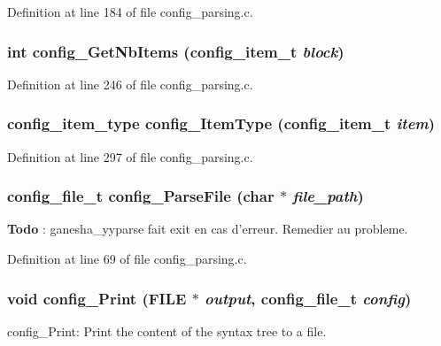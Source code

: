 Definition at line 184 of file config\_\-parsing.c.
\subsubsection[{config\_\-GetNbItems}]{\setlength{\rightskip}{0pt plus 5cm}int config\_\-GetNbItems (config\_\-item\_\-t {\em block})}\label{config__parsing_8c_a098e7a2614baf20bb96f612c3d7b8d69}


Definition at line 246 of file config\_\-parsing.c.
\subsubsection[{config\_\-ItemType}]{\setlength{\rightskip}{0pt plus 5cm}config\_\-item\_\-type config\_\-ItemType (config\_\-item\_\-t {\em item})}\label{config__parsing_8c_a447e838f4a3252ddabd4dc0be3bb6cdb}


Definition at line 297 of file config\_\-parsing.c.
\subsubsection[{config\_\-ParseFile}]{\setlength{\rightskip}{0pt plus 5cm}config\_\-file\_\-t config\_\-ParseFile (char $\ast$ {\em file\_\-path})}\label{config__parsing_8c_a27122b19350d87c1c46d4c3630a80826}


\begin{Desc}
\item[{\bf Todo}]: ganesha\_\-yyparse fait exit en cas d'erreur. Remedier au probleme. \end{Desc}


Definition at line 69 of file config\_\-parsing.c.
\subsubsection[{config\_\-Print}]{\setlength{\rightskip}{0pt plus 5cm}void config\_\-Print (FILE $\ast$ {\em output}, \/  config\_\-file\_\-t {\em config})}\label{config__parsing_8c_aff7eca609d048b1c63fb5dbe460cbff9}
config\_\-Print: Print the content of the syntax tree to a file. 

